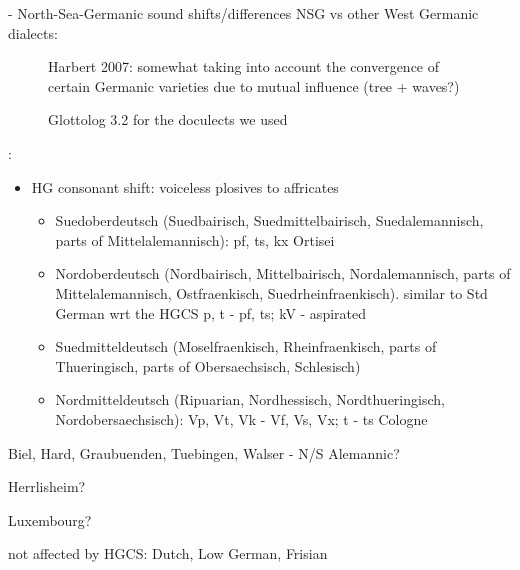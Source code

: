 \documentclass[a4paper]{article}
\begin{document}
- North-Sea-Germanic sound shifts/differences NSG vs other West Germanic dialects: \citet{stiles2013pan-west}

\begin{figure}
\centering

\caption{Harbert 2007: somewhat taking into account the convergence of certain Germanic varieties due to mutual influence (tree + waves?)}
\label{fig:cwg_harbert}
\end{figure}


\begin{figure}
\begin{adjustwidth}{-3cm}{-3cm}
\centering
\scalebox{0.8}{

}
\end{adjustwidth}
% 
\caption{Glottolog 3.2 for the doculects we used}
\end{figure}

\citet[pp. 182-199]{goblirsch2005lautverschiebungen}:

\begin{itemize}
  \item HG consonant shift: voiceless plosives to affricates 
  \begin{itemize}
    \item Suedoberdeutsch (Suedbairisch, Suedmittelbairisch, Suedalemannisch, parts of Mittelalemannisch): pf, ts, kx
    Ortisei
    \item Nordoberdeutsch (Nordbairisch, Mittelbairisch, Nordalemannisch, parts of Mittelalemannisch, Ostfraenkisch, Suedrheinfraenkisch).
    similar to Std German wrt the HGCS
    p, t - pf, ts; kV - aspirated
    \item Suedmitteldeutsch (Moselfraenkisch, Rheinfraenkisch, parts of Thueringisch, parts of Obersaechsisch, Schlesisch)
    \item Nordmitteldeutsch (Ripuarian, Nordhessisch, Nordthueringisch, Nordobersaechsisch):
    Vp, Vt, Vk - Vf, Vs, Vx; t - ts
    Cologne
  \end{itemize}
\end{itemize}

Biel, Hard, Graubuenden, Tuebingen, Walser - N/S Alemannic?

Herrlisheim?

Luxembourg?

not affected by HGCS: Dutch, Low German, Frisian
\end{document}
